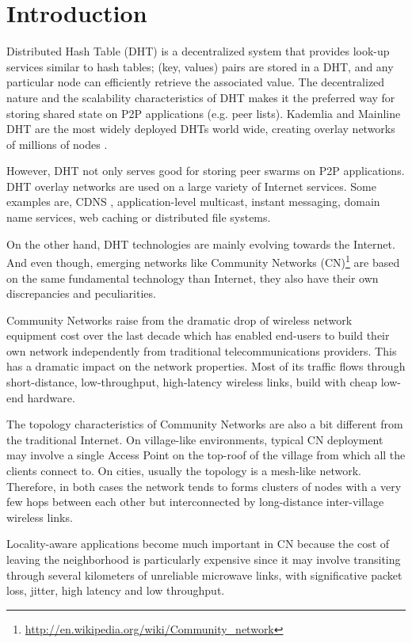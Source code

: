 \documentclass[conference]{IEEEtran}
\begin{document}
\section{Introduction}

Distributed Hash Table (DHT) is a decentralized system that provides look-up services similar to hash tables; (key, values) pairs are stored in a DHT, and any particular node can efficiently retrieve the associated value\cite{b30}. The decentralized nature and the scalability characteristics of DHT makes it the preferred way for storing shared state on P2P applications (e.g. peer lists). Kademlia and Mainline DHT are the most widely deployed DHTs world wide, creating overlay networks of millions of nodes \cite{b1}.

However, DHT not only serves good for storing peer swarms on P2P applications. DHT overlay networks are used on a large variety of Internet services. Some examples are, CDNS \cite{b2,b3}, application-level multicast, instant messaging, domain name services, web caching or distributed file systems.

On the other hand, DHT technologies are mainly evolving towards the Internet. And even though, emerging networks like Community Networks (CN)\footnote{\url{http://en.wikipedia.org/wiki/Community_network}} are based on the same fundamental technology than Internet, they also have their own discrepancies and peculiarities.

Community Networks raise from the dramatic drop of wireless network equipment cost over the last decade which has enabled end-users to build their own network independently from traditional telecommunications providers. This has a dramatic impact on the network properties. Most of its traffic flows through short-distance, low-throughput, high-latency wireless links, build with cheap low-end hardware.

The topology characteristics of Community Networks are also a bit different from the traditional Internet. On village-like environments, typical CN deployment may involve a single Access Point on the top-roof of the village from which all the clients connect to. On cities, usually the topology is a mesh-like network. Therefore, in both cases the network tends to forms clusters of nodes with a very few hops between each other but interconnected by long-distance inter-village wireless links.

Locality-aware applications become much important in CN because the cost of leaving the neighborhood is particularly expensive since it may involve transiting through several kilometers of unreliable microwave links, with significative packet loss, jitter, high latency and low throughput.
\end{document}
